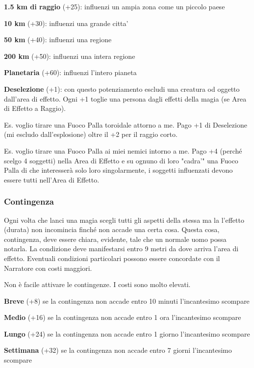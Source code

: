 \documentclass[a4paper,11pt,twoside,openany]{book}
\begin{document}
\textbf{1.5 km di raggio} (+25): influenzi un ampia zona come un piccolo paese

\textbf{10 km} (+30): influenzi una grande citta'

\textbf{50 km} (+40): influenzi una regione

\textbf{200 km} (+50): influenzi una intera regione

\textbf{Planetaria} (+60): influenzi l'intero pianeta

\textbf{Deselezione} (+1): con questo potenziamento escludi una creatura od oggetto dall'area di effetto. Ogni +1 toglie una persona dagli effetti della magia (se Area di Effetto a Raggio).

Es. voglio tirare una Fuoco Palla toroidale attorno a me. Pago +1 di Deselezione (mi escludo dall'esplosione) oltre il +2 per il raggio corto.

Es. voglio tirare una Fuoco Palla ai miei nemici intorno a me. Pago +4 (perché scelgo 4 soggetti) nella Area di Effetto e su ognuno di loro "cadra'" una Fuoco Palla di che interesserà solo loro singolarmente, i soggetti influenzati devono essere tutti nell'Area di Effetto.

\subsubsection{Contingenza}

\label{contingenza}

Ogni volta che lanci una magia scegli tutti gli aspetti della stessa ma la l'effetto (durata) non incomincia finché non accade una certa cosa. Questa cosa, contingenza, deve essere chiara, evidente, tale che un normale uomo possa notarla. La condizione deve manifestarsi entro 9 metri da dove arriva l'area di effetto. Eventuali condizioni particolari possono essere concordate con il Narratore con costi maggiori. 

Non è facile attivare le contingenze. I costi sono molto elevati.

\textbf{Breve} (+8) se la contingenza non accade entro 10 minuti l'incantesimo scompare

\textbf{Medio} (+16) se la contingenza non accade entro 1 ora l'incantesimo scompare

\textbf{Lungo} (+24) se la contingenza non accade entro 1 giorno l'incantesimo scompare

\textbf{Settimana} (+32) se la contingenza non accade entro 7 giorni l'incantesimo scompare
\end{document}
